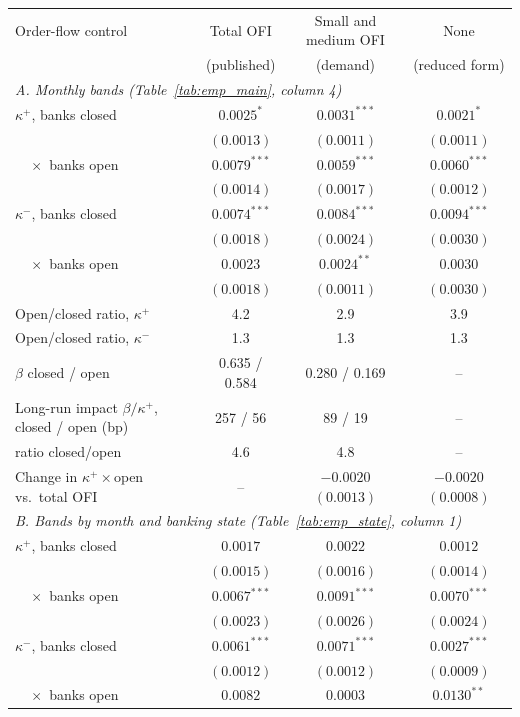 \begin{tabular}{lccc}
\toprule
Order-flow control & Total OFI & Small and medium OFI & None \\
 & (published) & (demand) & (reduced form) \\
\midrule
\multicolumn{4}{l}{\emph{A. Monthly bands (Table~\ref{tab:emp_main}, column 4)}} \\
$\kappa^+$, banks closed & $0.0025^{*}$ & $0.0031^{***}$ & $0.0021^{*}$ \\
 & $(0.0013)$ & $(0.0011)$ & $(0.0011)$ \\
$\quad\times$ banks open & $0.0079^{***}$ & $0.0059^{***}$ & $0.0060^{***}$ \\
 & $(0.0014)$ & $(0.0017)$ & $(0.0012)$ \\
$\kappa^-$, banks closed & $0.0074^{***}$ & $0.0084^{***}$ & $0.0094^{***}$ \\
 & $(0.0018)$ & $(0.0024)$ & $(0.0030)$ \\
$\quad\times$ banks open & $0.0023$ & $0.0024^{**}$ & $0.0030$ \\
 & $(0.0018)$ & $(0.0011)$ & $(0.0030)$ \\
Open/closed ratio, $\kappa^+$ & 4.2 & 2.9 & 3.9 \\
Open/closed ratio, $\kappa^-$ & 1.3 & 1.3 & 1.3 \\
$\beta$ closed / open & 0.635 / 0.584 & 0.280 / 0.169 & -- \\
Long-run impact $\beta/\kappa^+$, closed / open (bp) & 257 / 56 & 89 / 19 & -- \\
\quad ratio closed/open & 4.6 & 4.8 & -- \\
Change in $\kappa^+\times$open vs.\ total OFI & -- & $-0.0020$ $(0.0013)$ & $-0.0020$ $(0.0008)$ \\
\midrule
\multicolumn{4}{l}{\emph{B. Bands by month and banking state (Table~\ref{tab:emp_state}, column 1)}} \\
$\kappa^+$, banks closed & $0.0017$ & $0.0022$ & $0.0012$ \\
 & $(0.0015)$ & $(0.0016)$ & $(0.0014)$ \\
$\quad\times$ banks open & $0.0067^{***}$ & $0.0091^{***}$ & $0.0070^{***}$ \\
 & $(0.0023)$ & $(0.0026)$ & $(0.0024)$ \\
$\kappa^-$, banks closed & $0.0061^{***}$ & $0.0071^{***}$ & $0.0027^{***}$ \\
 & $(0.0012)$ & $(0.0012)$ & $(0.0009)$ \\
$\quad\times$ banks open & $0.0082$ & $0.0003$ & $0.0130^{**}$ \\

\end{tabular}
